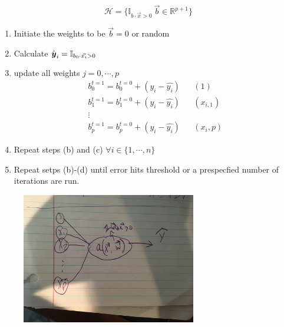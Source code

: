 \documentclass[12pt]{article}
\begin{document}

\begin{enumerate}


\begin{equation*}
\mathcal{H}=\{\mathbb{I}_{b\cdot\vec{x}>0}\:\vec{b}\in\mathbb{R}^{p+1}\}
\end{equation*}


\begin{enumerate}
\item Initiate the weights to be $\vec{b}=0$ or random
\item Calculate $\hat{\boldsymbol{y}}_i=\mathbb{I}_{b_0\cdot\vec{x_i}>0}$
\item update all weights $j=0,\cdots, p$ \begin{eqnarray*}
b_0^{t=1}=b_0^{t=0}+(y_i-\hat{y_i}) &&  (1)\\
b_1^{t=1}=b_1^{t=0}+(y_i-\hat{y_i}) && (x_{i,1})\\
\vdots \\
b_p^{t=1}=b_p^{t=0}+(y_i-\hat{y_i}) && (x_i,p)
\end{eqnarray*}
\item Repeat steps (b) and (c) $\forall i\in\{1,\cdots, n\}$
\item Repeat setps (b)-(d) until error hits threshold or a prespecfied number of iterations are run.
\end{enumerate}


\begin{figure}[htp]
\centering
\includegraphics[width=3in]{hw1t_4c.jpg}
\end{figure}


\end{enumerate}
\end{document}
